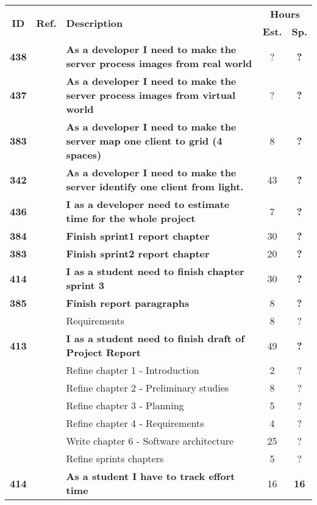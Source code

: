   \label{tab:sprint3stories}
 \def\arraystretch{1.25}
 
\begin{longtable}{ccXcc}

\toprule[1mm]
\multirow{2}{*}{\textbf{ID}} &
\multirow{2}{*}{\textbf{Ref.}} & \multirow{2}{*}{\textbf{Description}} & \multicolumn{2}{c}{\textbf{Hours}} \\
 					& & & \textbf{Est.} & \textbf{Sp.} \\
\midrule
\textbf{438} 	& {M4}
	& {\bf As a developer I need to make the server process images from real world}
	& ?
	& \textbf{?} \\

\textbf{437} 	& {M4}
	& {\bf As a developer I need to make the server process images from virtual world}
	& ?	
	& \textbf{?} \\
\textbf{383} 	& {M4}
	& {\bf As a developer I need to make the server map one client to grid (4 spaces)} 	
	& 8
	& \textbf{?} \\
	

\textbf{342} 	& {M4}
	& {\bf As a developer I need to make the server identify one client from light.} 	
	& 43
	& \textbf{?} \\
\midrule 
\textbf{436} 	&
	& {\bf I as a developer need to estimate time for the whole project}
	& 7
	& \textbf{?} \\
\textbf{384} 	&
	& {\bf Finish sprint1 report chapter} 	
	& 30
	& \textbf{?} \\
	
\textbf{383} 	& 
	& {\bf Finish sprint2 report chapter} 	
	& 20
	& \textbf{?} \\

\textbf{414} 	&
	& {\bf I as a student need to finish  chapter sprint 3} 	
	& 30
	& \textbf{?} \\

\textbf{385} 	&
	& {\bf Finish report paragraphs} 	
	& 8	
	& \textbf{?} \\
		&& Requirements	& 8 & ? \\
\textbf{413} 	& 
	& {\bf I as a student need to finish draft of Project Report} 	
	& 49
	& \textbf{?} \\
	&& Refine chapter 1 - Introduction & 2 & ?\\
	&& Refine chapter 2 - Preliminary studies & 8 & ?\\
	&& Refine chapter 3 - Planning & 5 & ?\\
	&& Refine chapter 4 - Requirements & 4 & ?\\
	&& Write chapter 6 - Software architecture & 25 & ?\\
	&& Refine sprints chapters & 5 & ?\\
\textbf{414} 	& 
	& {\bf  As a student I have to track effort time} 	& 		16	& \textbf{16} \\


\end{longtable}
